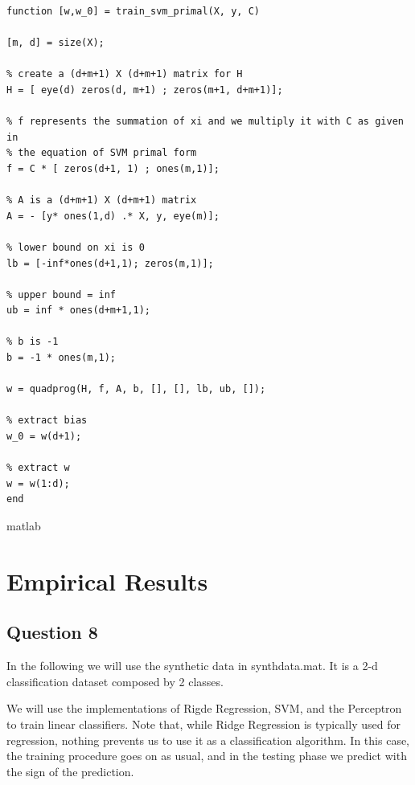\documentclass{article}
\begin{document}
\begin{enumerate}
\begin{verbatim}
function [w,w_0] = train_svm_primal(X, y, C)

[m, d] = size(X);

% create a (d+m+1) X (d+m+1) matrix for H
H = [ eye(d) zeros(d, m+1) ; zeros(m+1, d+m+1)];

% f represents the summation of xi and we multiply it with C as given in
% the equation of SVM primal form
f = C * [ zeros(d+1, 1) ; ones(m,1)];

% A is a (d+m+1) X (d+m+1) matrix
A = - [y* ones(1,d) .* X, y, eye(m)];

% lower bound on xi is 0
lb = [-inf*ones(d+1,1); zeros(m,1)];

% upper bound = inf
ub = inf * ones(d+m+1,1);

% b is -1
b = -1 * ones(m,1);

w = quadprog(H, f, A, b, [], [], lb, ub, []);

% extract bias
w_0 = w(d+1);

% extract w
w = w(1:d);
end
\end{verbatim}{matlab}
\end{enumerate}


\section{Empirical Results}
\subsection{Question 8}
In the following we will use the synthetic data in synthdata.mat. It is a 2-d classification dataset composed by 2 classes.

We will use the implementations of Rigde Regression, SVM, and the Perceptron to train linear classifiers. Note that, while Ridge Regression is typically used for regression, nothing prevents us to use it as a classification algorithm. In this case, the training procedure goes on as usual, and in the testing phase we predict with the sign of the prediction.
\end{document}

